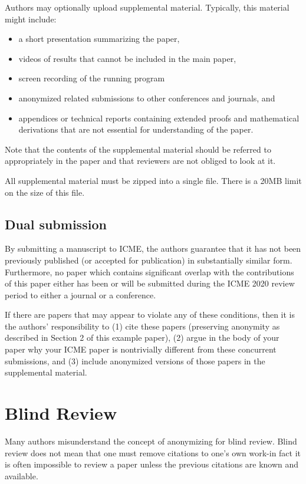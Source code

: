 \documentclass{article}
\begin{document}
Authors may optionally upload supplemental material. Typically, this material might include:
\begin{itemize}
  \item a short presentation summarizing the paper,
  \item videos of results that cannot be included in the main paper,
  \item screen recording of the running program
  \item anonymized related submissions to other conferences and journals, and
  \item appendices or technical reports containing extended proofs and mathematical derivations that are not essential for understanding of the paper.
\end{itemize}

Note that the contents of the supplemental material should be referred to appropriately in the paper and that reviewers are not obliged to look at it.

All supplemental material must be zipped into a single file. There is a 20MB limit on the size of this file.

\subsection{Dual submission}

By submitting a manuscript to ICME, the authors guarantee that it has not been previously published (or accepted for publication) in substantially similar form. Furthermore, no paper which contains significant overlap with the contributions of this paper either has been or will be submitted during the ICME 2020 review period to either a journal or a conference.

If there are papers that may appear to violate any of these conditions, then it is the authors' responsibility to (1) cite these papers (preserving anonymity as described in Section 2 of this example paper), (2) argue in the body of your paper why your ICME paper is nontrivially different from these concurrent submissions, and (3) include anonymized versions of those papers in the supplemental material.

\section{Blind Review}

Many authors misunderstand the concept of anonymizing for blind review. Blind review does not mean that one must remove citations to one's own work-in fact it is often impossible to review a paper unless the previous citations are known and available.
\end{document}
